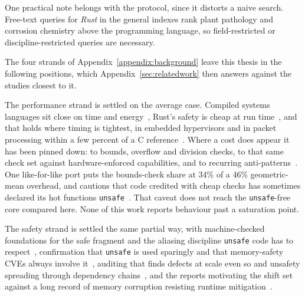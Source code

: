 \documentclass[english,oneside,a4paper,censored,csm,software-track-2020]{HYthesisML}
\begin{document}
\begin{appendices}
One practical note belongs with the protocol, since it distorts a naive search. Free-text queries
for \emph{Rust} in the general indexes rank plant pathology and corrosion chemistry above the
programming language, so field-restricted or discipline-restricted queries are necessary.

The four strands of Appendix~\ref{appendix:background} leave this thesis in the following
positions, which Appendix~\ref{sec:relatedwork} then answers against the studies closest to it.

The performance strand is settled on the average case. Compiled systems languages sit close on
time and energy~\cite{bugden2022rust,pereira2017energy}, Rust's safety is cheap at run
time~\cite{balasubramanian2017rust,levy2017kernel}, and that holds where timing is tightest, in
embedded hypervisors and in packet processing within a few percent of a C
reference~\cite{mo2023rustshyper,emmerich2019drivers,xiao2024rpkt}.
Where a cost does appear it has been pinned down: to bounds, overflow and division checks, to
that same check set against hardware-enforced capabilities, and to recurring
anti-patterns~\cite{zhang2022runtime,harris2023morello,cui2025perfbugs}. One like-for-like port
puts the bounds-check share at 34\% of a 46\% geometric-mean overhead, and cautions that code
credited with cheap checks has sometimes declared its hot functions
\texttt{unsafe}~\cite{naylor2026cherisimt}. That caveat does not reach the \texttt{unsafe}-free
core compared here. None of this work reports behaviour past a saturation point.

The safety strand is settled the same partial way, with machine-checked foundations for the
safe fragment and the aliasing discipline \texttt{unsafe} code has to
respect~\cite{jung2018rustbelt,jung2021safe,jung2020stacked}, confirmation that \texttt{unsafe} is
used sparingly and that memory-safety CVEs always involve
it~\cite{qin2020rust,astrauskas2020unsafe,xu2021rustcve}, auditing that finds defects at scale even
so and unsafety spreading through dependency
chains~\cite{bae2021rudra,zheng2024security,qin2024safety,evans2020rust}, and the reports
motivating the shift set against a long record of memory corruption resisting runtime
mitigation~\cite{msrc2019memory,google2022android,google2024securebydesign,cisa2023memorysafe,oncd2024building,szekeres2013sok}.


\end{appendices}
\end{document}
